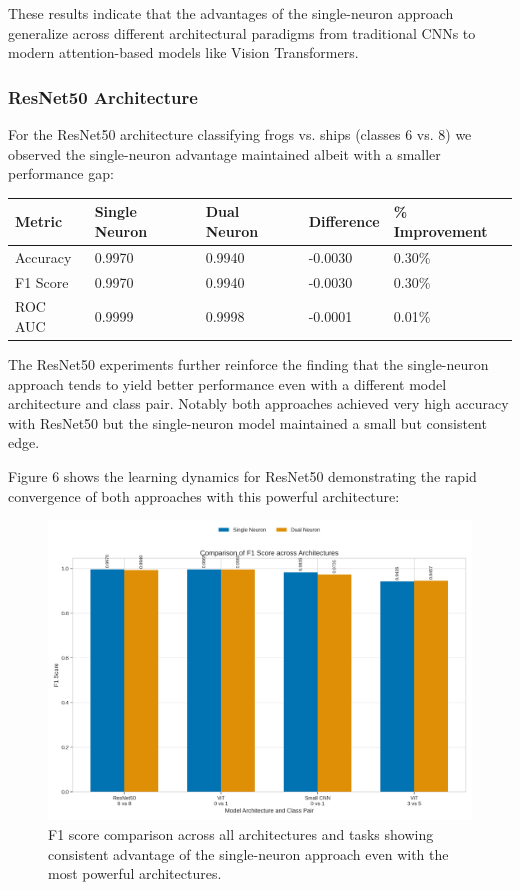 \documentclass[11pt]{article}
\begin{document}
These results indicate that the advantages of the single-neuron approach generalize across different architectural paradigms from traditional CNNs to modern attention-based models like Vision Transformers.

\subsubsection{ResNet50 Architecture}
For the ResNet50 architecture classifying frogs vs. ships (classes 6 vs. 8) we observed the single-neuron advantage maintained albeit with a smaller performance gap:

\begin{tabular}{lllll}
\hline
Metric & Single Neuron & Dual Neuron & Difference & \% Improvement \\
\hline
Accuracy & 0.9970 & 0.9940 & -0.0030 & 0.30\% \\
F1 Score & 0.9970 & 0.9940 & -0.0030 & 0.30\% \\
ROC AUC & 0.9999 & 0.9998 & -0.0001 & 0.01\% \\
\hline
\end{tabular}

The ResNet50 experiments further reinforce the finding that the single-neuron approach tends to yield better performance even with a different model architecture and class pair. Notably both approaches achieved very high accuracy with ResNet50 but the single-neuron model maintained a small but consistent edge.

Figure 6 shows the learning dynamics for ResNet50 demonstrating the rapid convergence of both approaches with this powerful architecture:

\begin{figure}[htbp]
\centering
\includegraphics[width=\textwidth]{figures/f1_score_comparison.png}
\caption{F1 score comparison across all architectures and tasks showing consistent advantage of the single-neuron approach even with the most powerful architectures.}
\end{figure}
\end{document}
